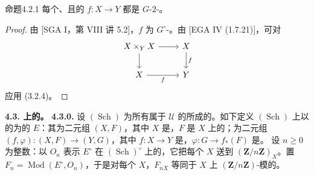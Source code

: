\begin{SGAresult}{命题}{4.2.1}
每个、且的 $f:X\to Y$ 都是 $G$-2-。
\end{SGAresult}
\begin{proof}
由 [SGA I，第 VIII 讲 5.2]，$f$ 为 $G^\circ$-。由 [EGA IV (1.7.21)]，可对
\[
\begin{tikzcd}
X\times_Y X\arrow[r]\arrow[d]&X\arrow[d,"f"]\\
X\arrow[r,"f"']&Y
\end{tikzcd}
\]
应用 (3.2.4)。
\end{proof}

\textbf{4.3. 上的。}
\textbf{4.3.0.} 设 $(\operatorname{Sch})$ 为所有属于 $\mathcal U$ 的所成的。如下定义 $(\operatorname{Sch})$ 上以的为的 $E$：其为二元组 $(X,F)$，其中 $X$ 是，$F$ 是 $X$ 上的；为二元组 $(f,\varphi):(X,F)\to(Y,G)$，其中 $f:X\to Y$ 是，$\varphi:G\to f_*(F)$ 是。
设 $n\geq0$ 为整数：以 $O_n$ 表示 $E^\circ$ 在 $(\operatorname{Sch})^\circ$ 上的，它把每个 $X$ 送到 $(\mathbf Z/n\mathbf Z)_X$。置 $F_n=\operatorname{Mod}(E^\circ,O_n)$，于是对每个 $X$，$F_{nX}$ 等同于 $X$ 上 $(\mathbf Z/n\mathbf Z)$-模的。

